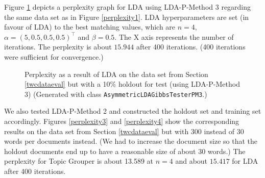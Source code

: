 \documentclass[10pt, a4paper, oneside]{article}
\begin{document}
Figure \ref{perplexity2} depicts a perplexity graph for LDA using LDA-P-Method 3 regarding the same data set as in Figure \ref{perplexity1}. LDA hyperparameters are set (in favour of LDA) to the best matching values, which are $n = 4$, $\alpha = (5, 0.5, 0.5, 0.5)^\top$ and $\beta=0.5$. The X axis represents the number of iterations. The perplexity is about $15.944$ after 400 iterations. (400 iterations were sufficient for convergence.)

\begin{figure}
\caption{Perplexity as a result of LDA on the data set from Section \ref{twcdataeval} but with a 10\% holdout for test (using LDA-P-Method 3) (Generated with class \texttt{AsymmetricLDAGibbsTesterPM3}.)}
\label{perplexity2}
\end{figure}

We also tested LDA-P-Method 2 and constructed the holdout set and training set accordingly. Figures \ref{perplexity3} and \ref{perplexity4} show the corresponding results on the data set from Section \ref{twcdataeval} but with 300 instead of 30 words per documents instead. (We had to increase the document size so that the holdout documents end up to have a reasonable size of about 30 words.) The perplexity for Topic Grouper is about 13.589 at $n = 4$ and about $15.417$ for LDA after 400 iterations.
\end{document}
